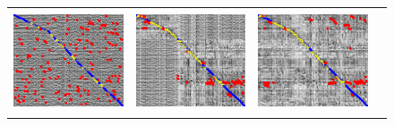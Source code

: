 \documentclass[letterpaper, 10 pt, conference]{ieeeconf}  %
\begin{document}
\newcommand{\imgH}{3cm}
\newcommand{\imgW}{4cm}
\begin{figure}
\centering
 \begin{tabular*}{\textwidth}[t]{cccc}
  \includegraphics[width=\imgW,height=\imgH]{campus-io-without-bad-101} &
  \includegraphics[width=\imgW,height=\imgH]{campus-io-with-bad-71} &
  \includegraphics[width=\imgW,height=\imgH]{campus-io-without-good-105} &

\end{tabular*}
\end{figure}
\end{document}
